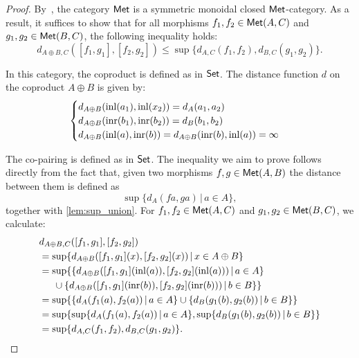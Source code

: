 \begin{proof}
  By~\cite[Example 3.8]{dahlqvist2023syntactic}, the category $\mathsf{Met}$ is a symmetric monoidal closed $\mathsf{Met}$-category. As a result, it suffices to show that for all morphisms \( f_1, f_2 \in \mathsf{Met}(A, C) \) and \( g_1, g_2 \in \mathsf{Met}(B, C) \), the following inequality holds:
\[
  d_{A \oplus B, C}([f_1, g_1], [f_2, g_2]) \leq \sup \{d_{A,C}(f_1, f_2), d_{B,C}(g_1, g_2)\}.
\]

In this category, the coproduct is defined as in $\mathsf{Set}$. The distance function $d$ on the coproduct $A \oplus B$ is given by:
   \[
    \begin{cases}
    d_{A \oplus B}(\mathrm{inl}(a_1),\mathrm{inl}(x_2)) = d_A(a_1,a_2) \\
    d_{A \oplus B}(\mathrm{inr}(b_1),\mathrm{inr}(b_2)) = d_B(b_1,b_2) \\
    d_{A \oplus B}(\mathrm{inl}(a), \mathrm{inr}(b)) = 
    d_{A \oplus B}(\mathrm{inr}(b), \mathrm{inl}(a))  = \infty
    \end{cases}
    \]

    The co-pairing is defined as in $\mathsf{Set}$. The inequality we aim to prove follows directly from the fact that, given two morphisms  $f,g\in \mathsf{Met}(A, B)$ the distance between them is defined as 
  \[ \sup \{ d_A (f a, g a) \,\vert \, a \in A \} ,\] 
    together with \autoref{lem:sup_union}. For  \( f_1, f_2 \in \mathsf{Met}(A, C) \) and \( g_1, g_2 \in \mathsf{Met}(B, C) \), we calculate:
    \begin{align*}
      & d_{A \oplus B, C}([f_1, g_1], [f_2, g_2]) \\
      &  =  \sup \{ d_{A\oplus B} ([f_1, g_1] (x), [f_2, g_2] (x)) \,\vert \, x \in A \oplus B \} \\
      & =  \sup \{ \{ d_{A\oplus B} ([f_1, g_1] (\mathrm{inl}(a)), [f_2, g_2] (\mathrm{inl}(a))) \,\vert \, a \in A \}    \\
      & \hspace{15pt} \cup \{d_{A\oplus B} ([f_1, g_1] (\mathrm{inr}(b)), [f_2, g_2] (\mathrm{inr}(b))) \,\vert \, b \in B\}\} \\
      & = \sup \{ \{ d_{A}(f_1 (a), f_2 (a)) \,\vert \, a \in A \} \cup  \{d_{B}(g_1 (b), g_2 (b)) \,\vert \, b \in B \}\} \\
      & = \sup   \{ \sup \{ d_{A}(f_1 (a), f_2 (a)) \,\vert \, a \in A \}, \sup\{d_{B}(g_1 (b), g_2 (b)) \,\vert \, b \in B \}\} \\
      &=  \sup \{d_{A,C}(f_1, f_2), d_{B,C}(g_1, g_2)\}. 
    \end{align*}
\end{proof}


